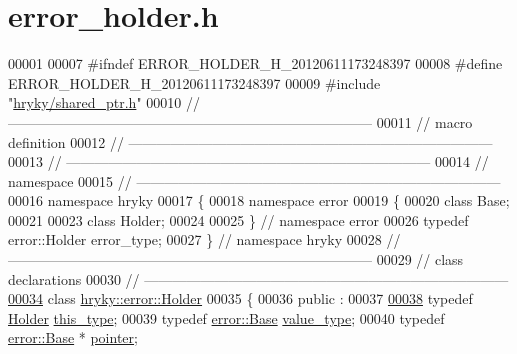 \hypertarget{error__holder_8h_source}{\section{error\-\_\-holder.\-h}
}

\begin{DoxyCode}
00001 
00007 \textcolor{preprocessor}{#ifndef ERROR\_HOLDER\_H\_20120611173248397}
00008 \textcolor{preprocessor}{}\textcolor{preprocessor}{#define ERROR\_HOLDER\_H\_20120611173248397}
00009 \textcolor{preprocessor}{}\textcolor{preprocessor}{#include "\hyperlink{shared__ptr_8h}{hryky/shared_ptr.h}"}
00010 \textcolor{comment}{//
      ------------------------------------------------------------------------------}
00011 \textcolor{comment}{// macro definition}
00012 \textcolor{comment}{//
      ------------------------------------------------------------------------------}
00013 \textcolor{comment}{//
      ------------------------------------------------------------------------------}
00014 \textcolor{comment}{// namespace}
00015 \textcolor{comment}{//
      ------------------------------------------------------------------------------}
00016 \textcolor{keyword}{namespace }hryky
00017 \{
00018 \textcolor{keyword}{namespace }error
00019 \{
00020     \textcolor{keyword}{class }Base;
00021     
00023     \textcolor{keyword}{class }Holder;
00024 
00025 \} \textcolor{comment}{// namespace error}
00026 \textcolor{keyword}{typedef} error::Holder error\_type;
00027 \} \textcolor{comment}{// namespace hryky}
00028 \textcolor{comment}{//
      ------------------------------------------------------------------------------}
00029 \textcolor{comment}{// class declarations}
00030 \textcolor{comment}{//
      ------------------------------------------------------------------------------}
\hypertarget{error__holder_8h_source_l00034}{}\hyperlink{classhryky_1_1error_1_1_holder}{00034} \textcolor{comment}{}\textcolor{keyword}{class }\hyperlink{classhryky_1_1error_1_1_holder}{hryky::error::Holder}
00035 \{
00036 \textcolor{keyword}{public} :
00037 
\hypertarget{error__holder_8h_source_l00038}{}\hyperlink{classhryky_1_1error_1_1_holder_a46d720ab7a2ddd82bd62f89fdb1d5c8d}{00038}     \textcolor{keyword}{typedef} \hyperlink{classhryky_1_1error_1_1_holder}{Holder}              \hyperlink{classhryky_1_1error_1_1_holder_a46d720ab7a2ddd82bd62f89fdb1d5c8d}{this_type};
00039     \textcolor{keyword}{typedef} \hyperlink{classhryky_1_1error_1_1_base}{error::Base}         \hyperlink{classhryky_1_1error_1_1_base}{value_type};
00040     \textcolor{keyword}{typedef} \hyperlink{classhryky_1_1error_1_1_base}{error::Base} *       \hyperlink{classhryky_1_1error_1_1_base}{pointer};

\end{DoxyCode}
